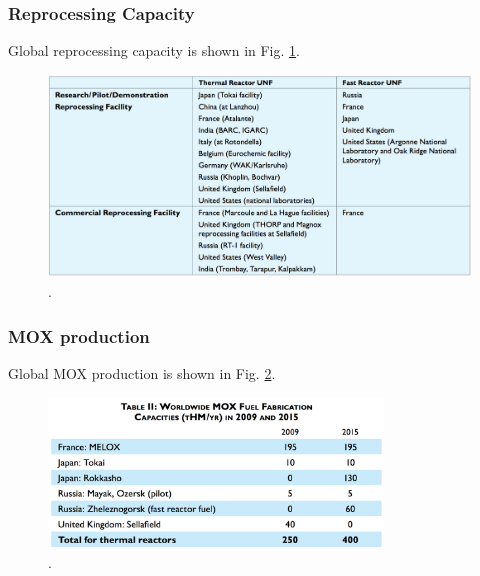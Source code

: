 
\begin{frame}
  \frametitle{Reprocessing Capacity}
  Global reprocessing capacity is shown in Fig. \ref{fig:reprocessing-nn}.
  \begin{figure}[htbp!]
    \begin{center}
      \includegraphics[width=\textwidth]{./images/reprocessing-nn}
    \end{center}
          \caption{\cite{buckner_case_2016}.}
    \label{fig:reprocessing-nn}
  \end{figure}
\end{frame}

\begin{frame}
  \frametitle{MOX production}
  Global MOX production is shown in Fig.
  \ref{fig:mox-production-nn}.
  \begin{figure}[htbp!]
    \begin{center}
      \includegraphics[height=4cm]{./images/mox-production-nn}
    \end{center}
          \caption{\cite{buckner_case_2016}.}
    \label{fig:mox-production-nn}
  \end{figure}
\end{frame}
